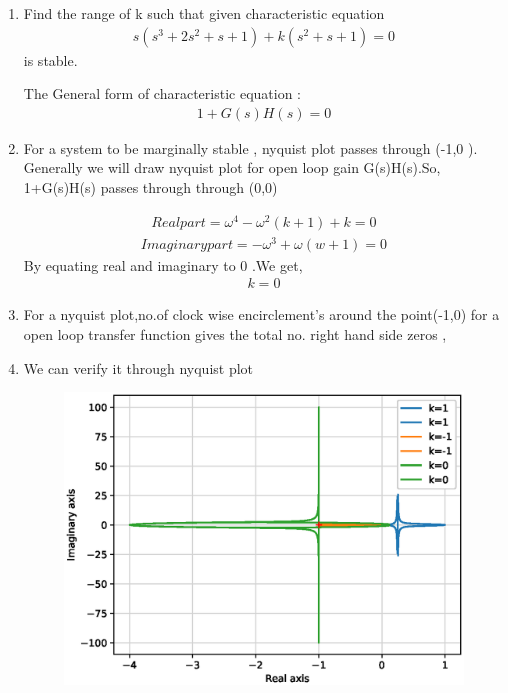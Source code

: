 \begin{enumerate}[label=\thesection.\arabic*.,ref=\thesection.\theenumi]
\item Find the range of k such that given characteristic equation
\begin{align}
s(s^3+2s^2+s+1) +k(s^2+s+1) = 0
\label{eq:ee18btech11042_1}
\end{align}
is stable.

\solution
The General form of characteristic equation :
\begin{align}
1+G(s)H(s) = 0
\label{eq:ee18btech11042_2}    
\end{align}
\item For a system to be marginally stable , nyquist plot passes through (-1,0 ). Generally we will draw nyquist plot for open loop gain G(s)H(s).So, 1+G(s)H(s) passes through through (0,0)

\begin{align}
Real part = \omega^4 - \omega^2(k+1) +k = 0
\label{eq:ee18btech11042_3}
\end{align}
\begin{align}
Imaginary part = -\omega^3 +\omega(w+1) = 0
\label{eq:ee18btech11042_4}
\end{align}
By equating real and imaginary to 0 .We get,
\begin{align}
k = 0
\label{eq:ee18btech11042_5}
\end{align}

\item For a nyquist plot,no.of clock wise encirclement's around the point(-1,0) for a open loop transfer function gives the total no. right hand side  zeros ,
\item We can verify it through nyquist plot

\begin{figure}[!h]
  \includegraphics[width=\columnwidth]{./figs/ee18btech11042_1.eps}
  \label{fig:ee18btech11042_1.eps}
\end{figure}



\end{enumerate}
